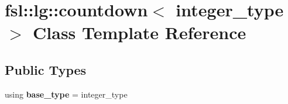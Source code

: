 \hypertarget{classfsl_1_1lg_1_1countdown}{}\section{fsl\+::lg\+::countdown$<$ integer\+\_\+type $>$ Class Template Reference}
\label{classfsl_1_1lg_1_1countdown}
\subsection*{Public Types}
\begin{DoxyCompactItemize}
\item 
\mbox{\label{classfsl_1_1lg_1_1countdown_a262b9c7413314c4e4c7d2ee7ed4333d7}} 
using {\bfseries base\+\_\+type} = integer\+\_\+type
\end{DoxyCompactItemize}

